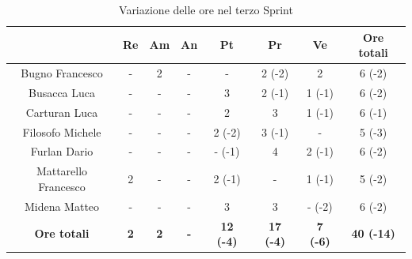 \begin{table}[H]
  \centering
  \renewcommand{\arraystretch}{1.8}
  \begin{tabular}{c|c|c|c|c|c|c|c}
    \rowcolor[HTML]{125E28}
    \multicolumn{1}{c}{\color[HTML]{FFFFFF}\textbf{ Nominativo }}
                         & \multicolumn{1}{c}{\color[HTML]{FFFFFF}\textbf{ Re }}
                         & \multicolumn{1}{c}{\color[HTML]{FFFFFF}\textbf{ Am}}
                         & \multicolumn{1}{c}{\color[HTML]{FFFFFF}\textbf{ An }}
                         & \multicolumn{1}{c}{\color[HTML]{FFFFFF}\textbf{ Pt }}
                         & \multicolumn{1}{c}{\color[HTML]{FFFFFF}\textbf{ Pr }}
                         & \multicolumn{1}{c}{\color[HTML]{FFFFFF}\textbf{ Ve }}
                         & \multicolumn{1}{c}{\color[HTML]{FFFFFF}\textbf{ Ore totali }}                                                                                                       \\
    \hline
    Bugno Francesco      & -                                                             & 2          & -          & -                & 2 (-2)           & 2               & 6 (-2)            \\
    Busacca Luca         & -                                                             & -          & -          & 3                & 2 (-1)           & 1 (-1)          & 6 (-2)            \\
    Carturan Luca        & -                                                             & -          & -          & 2                & 3                & 1 (-1)          & 6 (-1)            \\
    Filosofo Michele     & -                                                             & -          & -          & 2 (-2)           & 3 (-1)           & -               & 5 (-3)            \\
    Furlan Dario         & -                                                             & -          & -          & - (-1)           & 4                & 2 (-1)          & 6 (-2)            \\
    Mattarello Francesco & 2                                                             & -          & -          & 2 (-1)           & -                & 1 (-1)          & 5 (-2)            \\
    Midena Matteo        & -                                                             & -          & -          & 3                & 3                & - (-2)          & 6 (-2)            \\
    \textbf{Ore totali}  & \textbf{2}                                                    & \textbf{2} & \textbf{-} & \textbf{12 (-4)} & \textbf{17 (-4)} & \textbf{7 (-6)} & \textbf{40 (-14)}
  \end{tabular}
  \caption{Variazione delle ore nel terzo Sprint}
\end{table}

